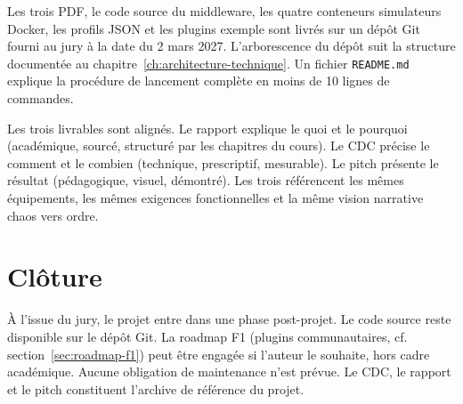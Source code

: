 Les trois PDF, le code source du middleware, les quatre conteneurs simulateurs Docker, les profils JSON et les plugins exemple sont livrés sur un dépôt Git fourni au jury à la date du 2 mars 2027. L'arborescence du dépôt suit la structure documentée au chapitre~\ref{ch:architecture-technique}. Un fichier \texttt{README.md} explique la procédure de lancement complète en moins de 10 lignes de commandes.

\begin{bridgeinfo}
Les trois livrables sont alignés. Le rapport explique le quoi et le pourquoi (académique, sourcé, structuré par les chapitres du cours). Le CDC précise le comment et le combien (technique, prescriptif, mesurable). Le pitch présente le résultat (pédagogique, visuel, démontré). Les trois référencent les mêmes équipements, les mêmes exigences fonctionnelles et la même vision narrative chaos vers ordre.
\end{bridgeinfo}

\section{Clôture}
\label{sec:cloture}

À l'issue du jury, le projet entre dans une phase post-projet. Le code source reste disponible sur le dépôt Git. La roadmap F1 (plugins communautaires, cf. section~\ref{sec:roadmap-f1}) peut être engagée si l'auteur le souhaite, hors cadre académique. Aucune obligation de maintenance n'est prévue. Le CDC, le rapport et le pitch constituent l'archive de référence du projet.
